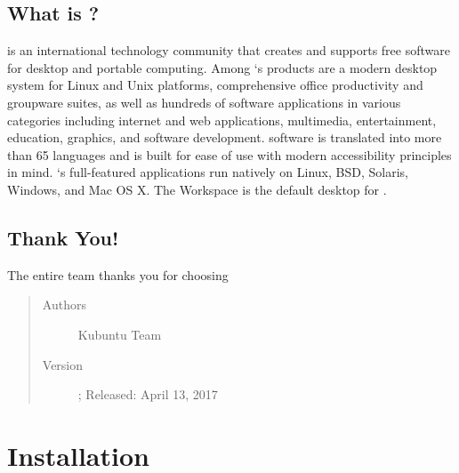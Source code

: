\documentclass[letterpaper,10pt,english]{sphinxmanual}
\begin{document}
\section{What is ?}
\label{\detokenize{welcome:what-is-kde}}
 is an international technology community that creates and supports free software for desktop and portable computing. Among `s products are a modern desktop system for Linux and Unix platforms, comprehensive office productivity and groupware suites, as well as hundreds of software applications in various categories including internet and web applications, multimedia, entertainment, education, graphics, and software development.  software is translated into more than 65 languages and is built for ease of use with modern accessibility principles in mind. `s full-featured applications run natively on Linux, BSD, Solaris, Windows, and Mac OS X. The  Workspace is the default desktop for .


\section{Thank You!}
\label{\detokenize{welcome:thank-you}}
The entire  team thanks you for choosing 
\begin{quote}\begin{description}
\item[{Authors}] \leavevmode
Kubuntu Team

\item[{Version}]  ; Released: April 13, 2017

\end{description}\end{quote}


\chapter{Installation}
\label{\detokenize{docs/installation::doc}}\label{\detokenize{docs/installation:installation}}
\end{document}
